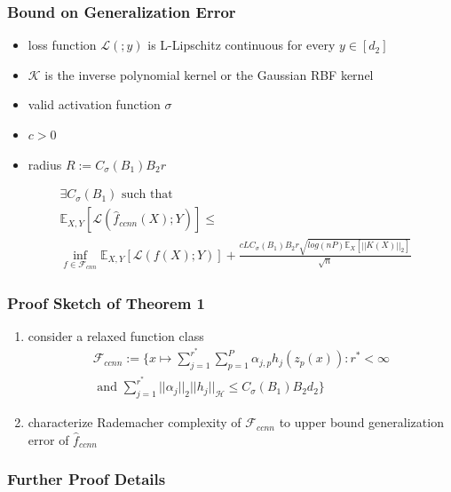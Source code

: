 \documentclass[hyperref={colorlinks}]{beamer}
\begin{document}
\begin{frame}
	\frametitle{Bound on Generalization Error}
		\begin{itemize}
			\item loss function $\mathcal{L}(;y)$ is L-Lipschitz continuous for every $y \in [d_2]$
			\item $\mathcal{K}$ is the inverse polynomial kernel or the Gaussian RBF kernel
			\item valid activation function $\sigma$
			\item $c>0$
			\item radius $R:=C_\sigma(B_1)B_2r$
		\end{itemize}
	\begin{align*}
		&\exists C_\sigma(B_1) \text{ such that } \\
		&\mathbb{E}_{X,Y}[\mathcal{L}(\hat{f}_{ccnn}(X);Y)]\leq \\ 
		&\inf\limits_{f\in \mathcal{F}_{cnn}} \mathbb{E}_{X,Y}[\mathcal{L}(f(X);Y)]+ \frac{cLC_{\sigma}(B_1)B_2 r\sqrt{log(nP)\mathbb{E}_X[||K(X)||_2]}}{\sqrt{n}}
	\end{align*}	
\end{frame}

\begin{frame}
	\frametitle{Proof Sketch of Theorem 1}
	\begin{enumerate}
		\item consider a relaxed function class
		\begin{align*}
			\mathcal{F}_{ccnn}:=\Big\{x\mapsto \sum_{j = 1}^{r^*} \sum_{p = 1}^P \alpha_{j, p} h_j(z_p(x)) : r^*<\infty \\ 
			\text{ and } \sum_{j = 1}^{r^*} ||\alpha_j||_2||h_j||_{\mathcal{H}}\leq C_{\sigma}(B_1)B_2d_2 \Big\}
		\end{align*}
		\item characterize Rademacher complexity of $\mathcal{F}_{ccnn}$ to upper bound generalization error of $\hat{f}_{ccnn}$
	\end{enumerate}
\end{frame}

\begin{frame}
	\frametitle{Further Proof Details}
\end{frame}
\end{document}

